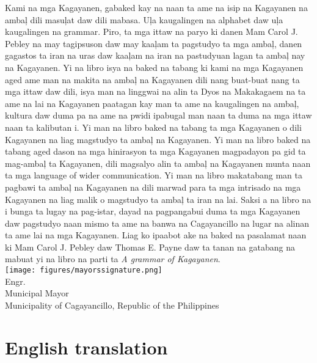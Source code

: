 
\noindent Kami na mga Kagayanen, gabaked kay na naan ta ame na isip na Kagayanen na ambaļ dili masuļat daw dili mabasa. Uļa kaugalingen na alphabet daw uļa kaugalingen na grammar. Piro, ta mga ittaw na paryo ki danen Mam Carol J. Pebley na may tagipsuson daw may kaaļam ta pagstudyo ta mga ambaļ, danen gagastos ta iran na uras daw kaaļam na iran na pastudyuan lagan ta ambaļ nay na Kagayanen. Yi na libro isya na baked na tabang ki kami na mga Kagayanen aged ame man na makita na ambaļ na Kagayanen dili nang buat-buat nang ta mga ittaw daw dili, isya man na linggwai na alin ta Dyos na Makakagaem na ta ame na lai na Kagayanen paatagan kay man ta ame na kaugalingen na ambaļ, kultura daw duma pa na ame na pwidi ipabugal man naan ta duma na mga ittaw naan ta kalibutan i. Yi man na libro baked na tabang ta mga Kagayanen o dili Kagayanen na liag magstudyo ta ambaļ na Kagayanen. Yi man na libro baked na tabang aged dason na mga hinirasyon ta mga Kagayanen magpadayon pa gid ta mag-ambaļ ta Kagayanen, dili magsalyo alin ta ambaļ na Kagayanen munta naan ta mga language of wider communication. Yi man na libro makatabang man ta pagbawi ta ambaļ na Kagayanen na dili marwad para ta mga intrisado na mga Kagayanen na liag malik o magstudyo ta ambaļ ta iran na lai. Saksi a na libro na i bunga ta lugay na pag-istar, dayad na pagpangabui duma ta mga Kagayanen daw pagstudyo naan mismo ta ame na banwa na Cagayancillo na lugar na alinan ta ame lai na mga Kagayanen. Liag ko ipaabot ake na baked na pasalamat naan ki Mam Carol J. Pebley daw Thomas E. Payne daw ta tanan na gatabang na mabuat yi na libro na parti ta \textit{A grammar of Kagayanen}.\medskip\\
\noindent\texttt{[image: figures/mayorssignature.png]}\\
\noindent Engr.  \\
\noindent Municipal Mayor\\
\noindent Municipality of Cagayancillo, Republic of the Philippines

\section*{English translation}

